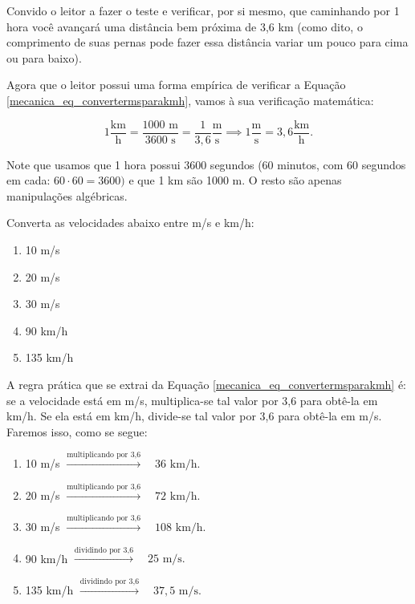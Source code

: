 Convido o leitor a fazer o teste e verificar, por si mesmo, que caminhando por 1 hora você avançará uma distância bem próxima de 3,6 km (como dito, o comprimento de suas pernas pode fazer essa distância variar um pouco para cima ou para baixo).

Agora que o leitor possui uma forma empírica de verificar a Equação \eqref{mecanica_eq_convertermsparakmh}, vamos à sua verificação matemática:

$$ 1 \dfrac{\text{km}}{\text{h}} = \dfrac{1000 \text{ m}}{3600 \text{ s}} = \dfrac{1}{3,6} \dfrac{\text{m}}{\text{s}} \implies 1 \dfrac{ \text{m}}{\text{s}} = 3,6 \dfrac{\text{km}}{\text{h}}. $$

Note que usamos que 1 hora possui 3600 segundos (60 minutos, com 60 segundos em cada: $60\cdot 60 = 3600 )$ e que 1 km são 1000 m. O resto são apenas manipulações algébricas.



\vspace{0.3cm}

\begin{exemplo}[Nível I]\label{exemplo_cinematicaescalar_velocidademedia01}

Converta as velocidades abaixo entre m/s e km/h:

\begin{enumerate}
    \item [(a)] 10 m/s
    \item [(b)] 20 m/s
    \item [(c)] 30 m/s
    \item [(d)] 90 km/h
    \item [(e)] 135 km/h
\end{enumerate}


\resolucao


A regra prática que se extrai da Equação \eqref{mecanica_eq_convertermsparakmh} é: se a velocidade está em m/s, multiplica-se tal valor por 3,6 para obtê-la em km/h. Se ela está em km/h, divide-se tal valor por 3,6 para obtê-la em m/s. Faremos isso, como se segue:

\begin{enumerate}
    \item  [(a)] 10 m/s \quad $\xrightarrow{\text{multiplicando por 3,6}} \quad 36 \text{ km/h}.$
    \item  [(b)] 20 m/s \quad $\xrightarrow{\text{multiplicando por 3,6}} \quad 72 \text{ km/h}.$
    \item  [(c)] 30 m/s \quad $\xrightarrow{\text{multiplicando por 3,6}} \quad 108 \text{ km/h}.$
    \item  [(d)] 90 km/h \quad $\xrightarrow{\text{dividindo por 3,6}} \quad 25 \text{ m/s}.$
    \item  [(e)] 135 km/h \quad $\xrightarrow{\text{dividindo por 3,6}} \quad 37,5 \text{ m/s}.$
\end{enumerate}

    
\end{exemplo}





